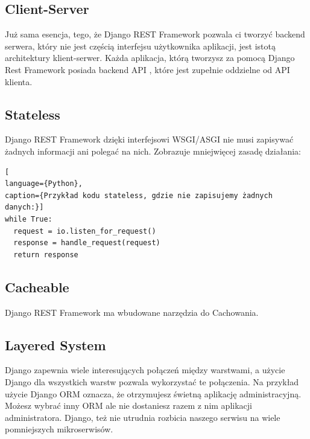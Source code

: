 \documentclass[oneside,polski,logo,indent]{amuthesis}
\begin{document}
\begin{enumerate}
\begin{enumerate}
\begin{center}
\subsection{Client-Server}
\end{center}
Już sama esencja, tego, że Django REST Framework pozwala ci tworzyć backend serwera, który nie jest częścią interfejsu użytkownika aplikacji, jest istotą architektury klient-serwer. Każda aplikacja, którą tworzysz za pomocą Django Rest Framework posiada backend API , które jest zupełnie oddzielne od API klienta.


\begin{center}
\subsection{Stateless}
\end{center}
Django REST Framework dzięki interfejsowi WSGI/ASGI nie musi zapisywać żadnych informacji ani polegać na nich. Zobrazuje mniejwięcej zasadę działania:


\begin{lstlisting}[
language={Python},
caption={Przykład kodu stateless, gdzie nie zapisujemy żadnych danych:}]
while True:
  request = io.listen_for_request()
  response = handle_request(request)
  return response
\end{lstlisting}

\begin{center}
\subsection{Cacheable}
\end{center}
Django REST Framework ma wbudowane narzędzia do Cachowania.


\begin{center}
\subsection{Layered System}
\end{center}
Django zapewnia wiele interesujących połączeń między warstwami, a użycie Django dla wszystkich warstw pozwala wykorzystać te połączenia. Na przykład użycie Django ORM oznacza, że otrzymujesz świetną aplikację administracyjną. Możesz wybrać inny ORM ale nie dostaniesz razem z nim aplikacji administratora. Django, też nie utrudnia rozbicia naszego serwisu na wiele pomniejszych mikroserwisów. 



\end{enumerate}
\end{enumerate}
\end{document}
